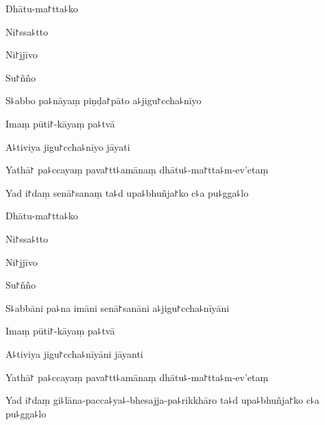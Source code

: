 Dhātu-ma꜓tta꜕ko


Ni꜓ssa꜕tto


Ni꜓jjīvo


Su꜓ñño


S꜕abbo pa꜕nāyaṃ piṇḍa꜓pāto a꜕jigu꜓ccha꜕nīyo


Imaṃ pūti꜓-kāyaṃ pa꜕tvā


A꜕tiviya jigu꜓ccha꜕nīyo jāyati


Yathā꜓ pa꜕ccayaṃ pava꜓tt꜕amānaṃ dhātu꜕-ma꜓tta꜕m-ev'etaṃ


Yad i꜓daṃ senā꜓sanaṃ ta꜕d upa꜕bhuñja꜓ko c꜕a pu꜕gga꜕lo


Dhātu-ma꜓tta꜕ko


Ni꜓ssa꜕tto


Ni꜓jjīvo


Su꜓ñño


S꜕abbāni pa꜕na imāni senā꜓sanāni a꜕jigu꜓ccha꜕nīyāni


Imaṃ pūti꜓-kāyaṃ pa꜕tvā


A꜕tiviya jigu꜓ccha꜕nīyāni jāyanti


Yathā꜓ pa꜕ccayaṃ pava꜓tt꜕amānaṃ dhātu꜕-ma꜓tta꜕m-ev'etaṃ


Yad i꜓daṃ gi꜕lāna-pacca꜕ya꜕-bhesajja-pa꜕rikkhāro ta꜕d upa꜕bhuñja꜓ko c꜕a pu꜕gga꜕lo

